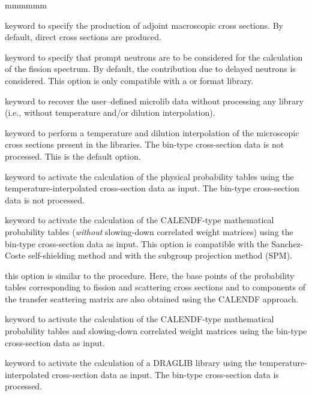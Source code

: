 \begin{ListeDeDescription}{mmmmmm}
\item[\moc{ADJ}] keyword to specify the production of adjoint macroscopic
cross sections. By default, direct cross sections are produced.

\item[\moc{PROM}] keyword to specify that prompt neutrons are to be considered
for the calculation of the fission spectrum. By default, the contribution due to
delayed neutrons is considered. This option is only compatible with a
 or  format library.

\item[\moc{SKIP}] keyword to recover the user--defined microlib data without processing
any library (i.e., without temperature and/or dilution interpolation).

\item[\moc{INTR}] keyword to perform a temperature and dilution interpolation
of the microscopic cross sections present in the libraries. The bin-type
cross-section data is not processed. This is the default option.

\item[\moc{SUBG}] keyword to activate the calculation of the physical probability
tables using the tempera\-tu\-re-interpolated cross-section data as
input.\cite{subg,nse2004} The bin-type cross-section data is not processed.

\item[\moc{PT}] keyword to activate the calculation of the CALENDF-type
mathematical probability tables ({\sl without} slowing-down correlated weight matrices)
using the bin-type cross-section data as input.\cite{pt} This option is
compatible with the Sanchez-Coste self-shielding method and with the subgroup projection method (SPM).\cite{SPM09}

\item[\moc{PTMC}] this option is similar to the  procedure. Here, the base points of the probability tables corresponding
to fission and scattering cross sections and to components of the transfer scattering matrix are also obtained using the CALENDF approach.

\item[\moc{PTSL}] keyword to activate the calculation of the CALENDF-type
mathematical probability tables and slowing-down correlated weight matrices
using the bin-type cross-section data as input.\cite{nse2004}

\item[\moc{NEWL}] keyword to activate the calculation of a DRAGLIB library
using the temperature-interpo\-la\-ted cross-section data as input. The bin-type
cross-section data is processed.


\end{ListeDeDescription}
